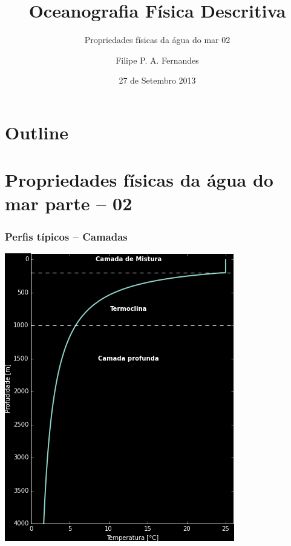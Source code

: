 \title[Aula 05]{Oceanografia Física Descritiva}
\subtitle{Propriedades físicas da água do mar 02}
\author[Filipe Fernandes]{Filipe P. A. Fernandes}
\date[Setembro 2013]{27 de Setembro 2013}




\begin{frame}[plain]
  \titlepage
\end{frame}

\section*{Outline}
\begin{frame}
\tableofcontents
\end{frame}

\section{Propriedades físicas da água do mar parte -- 02}

\begin{frame}
\frametitle{Perfis típicos -- Camadas}
    \begin{center}
        \includegraphics[scale=0.4]{./figures/temperature_profile.png}
    \end{center}
\end{frame}

